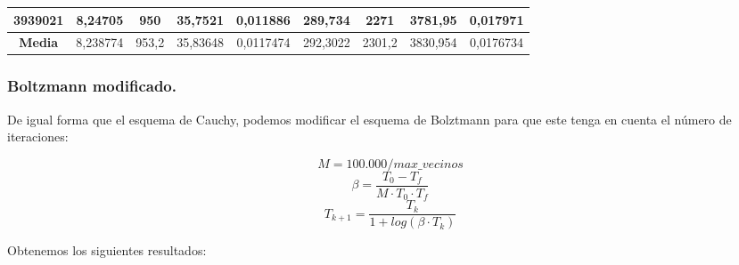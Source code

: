 \documentclass[12pt, spanish]{article}
\begin{document}
\begin{table}[H]
\begin{tabular}{|c|c|c|c|c|c|c|c|c|}
3939021           & 8,24705                   & 950                         & 35,7521                & 0,011886   & 289,734                   & 2271                        & 3781,95                & 0,017971   \\ \hline
\textbf{Media}    & 8,238774                  & 953,2                       & 35,83648               & 0,0117474  & 292,3022                  & 2301,2                      & 3830,954               & 0,0176734  \\ \hline
\end{tabular}
\end{table}


\subsubsection{Boltzmann modificado.}

De igual forma que el esquema de Cauchy, podemos modificar el esquema de Bolztmann para que este tenga en cuenta el número de iteraciones:

$$ M = 100.000/max\_vecinos $$
$$ \beta = \frac{T_0 - T_f}{M \cdot T_0 \cdot T_f} $$
$$ T_{k+1} = \frac{T_k}{1 + log(\beta \cdot T_k)} $$

Obtenemos los siguientes resultados:
\end{document}
